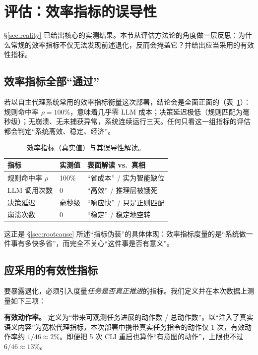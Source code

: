 \section{评估：效率指标的误导性}
\label{sec:eval}

\S\ref{sec:reality} 已给出核心的实测结果。本节从评估方法论的角度做一层反思：为什么常规的效率指标不仅无法发现前述退化，反而会掩盖它？并给出应当采用的有效性指标。

\subsection{效率指标全部“通过”}

若以自主代理系统常用的效率指标衡量这次部署，结论会是全面正面的（表~\ref{tab:misleading}）：规则命中率 $\rho=100\%$，意味着几乎零 LLM 成本；决策延迟极低（规则匹配为毫秒级）；无崩溃、无未捕获异常，系统连续运行三天。任何只看这一组指标的评估都会判定“系统高效、稳定、经济”。

\begin{table}[t]
  \centering\small
  \caption{效率指标（真实值）与其误导性解读。}
  \label{tab:misleading}
  \begin{tabular}{@{}lll@{}}
    \toprule
    指标 & 实测值 & 表面解读 vs.\ 真相 \\
    \midrule
    规则命中率 $\rho$ & 100\% & “省成本” / 实为智能缺位 \\
    LLM 调用次数 & 0 & “高效” / 推理层被饿死 \\
    决策延迟 & 毫秒级 & “响应快” / 只是正则匹配 \\
    崩溃次数 & 0 & “稳定” / 稳定地空转 \\
    \bottomrule
  \end{tabular}
\end{table}

这正是 \S\ref{sec:rootcause} 所述“指标伪装”的具体体现：效率指标度量的是“系统做一件事有多快多省”，而完全不关心“这件事是否有意义”。

\subsection{应采用的有效性指标}

要暴露退化，必须引入度量\emph{任务是否真正推进}的指标。我们定义并在本次数据上测量如下三项：

\textbf{有效动作率。} 定义为“带来可观测任务进展的动作数 / 总动作数”。以“注入了真实语义内容”为宽松代理指标，本次部署中携带真实任务指令的动作仅 1 次，有效动作率约 $1/46\approx 2\%$。即便把 5 次 CLI 重启也算作“有意图的动作”，上限也不过 $6/46\approx13\%$。

